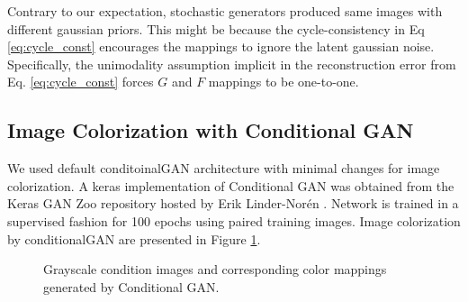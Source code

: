 \documentclass{article} %
\begin{document}
Contrary to our expectation, stochastic generators produced same images with different gaussian priors. This might be because the cycle-consistency in Eq \ref{eq:cycle_const} encourages the mappings to ignore the latent gaussian noise. Specifically, the unimodality assumption implicit in the reconstruction error from Eq. \ref{eq:cycle_const} forces $G$ and $F$ mappings to be one-to-one.

\subsection{Image Colorization with Conditional GAN}
We used default conditoinalGAN architecture with minimal changes for image colorization. A keras implementation of Conditional GAN was obtained from the Keras GAN Zoo repository hosted by Erik Linder-Norén \cite{conditionalganImpl}. Network is trained in a supervised fashion for 100 epochs using paired training images. Image colorization by conditionalGAN are presented in Figure \ref{fig:conditional_gan_results}.

\begin{figure}[!htb]
	\begin{center}
	\end{center}
	\caption{Grayscale condition images and corresponding color mappings generated by Conditional GAN.}
	\label{fig:conditional_gan_results}
\end{figure}
\end{document}
